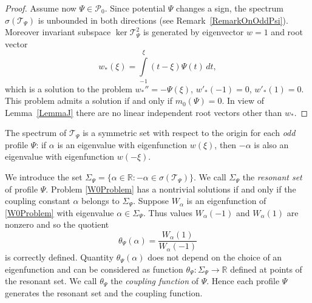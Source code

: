 \documentclass[11pt,english]{amsart}%
\begin{document}
\begin{proof}
Assume now $\Psi\in \mathcal{P}_0$. Since potential $\Psi$ changes a sign,  the spectrum  $\sigma(\mathcal{T}_\Psi)$ is unbounded  in both directions \cite{CurJDE} (see Remark~\ref{RemarkOnOddPsi}).
Moreover  invariant subspace  $\ker \mathcal{T}_\Psi^2$ is generated by eigenvector $w=1$ and root vector
$$
w_*(\xi)=\int\limits_{-1}^{\xi}(t-\xi)\Psi(t)\,dt,
$$
which is a solution to the problem $w_*''=-\Psi(\xi)$, $w'_*(-1)=0$, $w'_*(1)=0$.
This problem admits a solution if and only if $m_0(\Psi)=0$. In view of Lemma~\ref{LemmaJ} there are no linear independent root  vectors other than $w_*$.
\end{proof}

\begin{g_remark}\label{RemarkOnOddPsi}\rm
The spectrum of $\mathcal{T}_\Psi$ is a symmetric set  with respect to the origin for each \emph{odd} profile $\Psi$:
if $\alpha$ is an eigenvalue with eigenfunction $w(\xi)$, then $-\alpha$ is also an eigenvalue with eigenfunction $w(-\xi)$.
\end{g_remark}


We introduce the set $\Sigma_\Psi=\{\alpha\in \mathbb{R}\colon -\alpha\in \sigma(\mathcal{T}_\Psi)\} $. We call
$\Sigma_\Psi$ the \emph{resonant set} of  profile  $\Psi$.
Problem \eqref{W0Problem} has a nontrivial solutions if and only if the coupling constant $\alpha$ belongs to  $\Sigma_\Psi$. Suppose $W_\alpha$ is an eigenfunction of \eqref{W0Problem} with eigenvalue $\alpha\in \Sigma_\Psi$. Thus values $W_\alpha(-1)$ and $W_\alpha(1)$ are nonzero and so the quotient
$$
\theta_\Psi (\alpha)=\frac{W_\alpha(1)}{W_\alpha(-1)}
$$
is correctly defined.
Quantity $\theta_\Psi (\alpha)$ does not depend on the choice of an eigenfunction and can be considered as  function $\theta_\Psi \colon\Sigma_\Psi \to \mathbb{R}$ defined at points of the resonant set. We call $\theta_\Psi$
the  \emph{coupling function} of  $\Psi$. Hence each profile $\Psi$ generates the resonant set and the coupling function.
\end{document}
